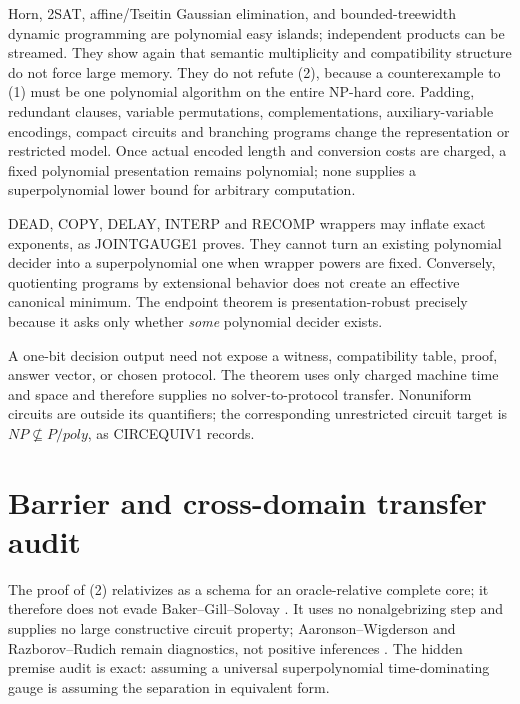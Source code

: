 \documentclass[11pt]{article}
\begin{document}
Horn, 2SAT, affine/Tseitin Gaussian elimination, and bounded-treewidth dynamic
programming are polynomial easy islands; independent products can be streamed.
They show again that semantic multiplicity and compatibility structure do not
force large memory.  They do not refute (2), because a counterexample to (1)
must be one polynomial algorithm on the entire NP-hard core.  Padding,
redundant clauses, variable permutations, complementations, auxiliary-variable
encodings, compact circuits and branching programs change the representation
or restricted model.  Once actual encoded length and conversion costs are
charged, a fixed polynomial presentation remains polynomial; none supplies a
superpolynomial lower bound for arbitrary computation.

DEAD, COPY, DELAY, INTERP and RECOMP wrappers may inflate exact exponents, as
JOINTGAUGE1 proves.  They cannot turn an existing polynomial decider into a
superpolynomial one when wrapper powers are fixed.  Conversely, quotienting
programs by extensional behavior does not create an effective canonical
minimum.  The endpoint theorem is presentation-robust precisely because it
asks only whether \emph{some} polynomial decider exists.

A one-bit decision output need not expose a witness, compatibility table,
proof, answer vector, or chosen protocol.  The theorem uses only charged
machine time and space and therefore supplies no solver-to-protocol transfer.
Nonuniform circuits are outside its quantifiers; the corresponding unrestricted
circuit target is $NP\not\subseteq P/poly$, as CIRCEQUIV1 records.

\section{Barrier and cross-domain transfer audit}

The proof of (2) relativizes as a schema for an oracle-relative complete core;
it therefore does not evade Baker--Gill--Solovay \cite{BGS75}.  It uses no
nonalgebrizing step and supplies no large constructive circuit property;
Aaronson--Wigderson and Razborov--Rudich remain diagnostics, not positive
inferences \cite{AW09,RR97}.  The hidden premise audit is exact: assuming a
universal superpolynomial time-dominating gauge is assuming the separation in
equivalent form.
\end{document}
